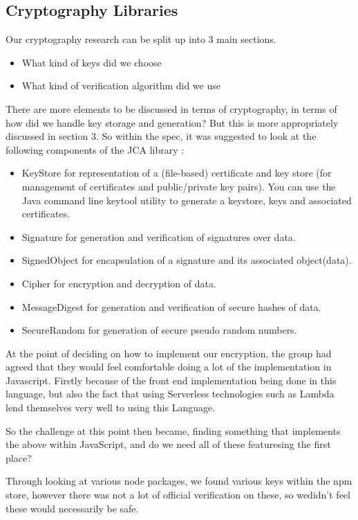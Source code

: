 \documentclass[runningheads]{llncs}
\begin{document}
\subsection{Cryptography Libraries}
Our cryptography research can be split up into 3 main sections.
\begin{itemize}
	\item What kind of keys did we choose
	\item What kind of verification algorithm did we use
\end{itemize}
There are more elements to be discussed in terms of cryptography, in terms of how did we handle key storage and generation? But this is more appropriately discussed in section 3. So within the spec, it was suggested to look at the following components of the JCA library :
\begin{itemize}
	\item KeyStore for representation of a (file-based) certificate and key store (for management of certificates and public/private key pairs). You can use the Java command line keytool utility to generate a keystore, keys and associated certificates.
	\item Signature for generation and verification of signatures over data.
	\item SignedObject for encapsulation of a signature and its associated object(data).
	\item Cipher for encryption and decryption of data.
	\item MessageDigest for generation and verification of secure hashes of data.
	\item SecureRandom for generation of secure pseudo random numbers.
\end{itemize} 
At the point of deciding on how to implement our encryption, the group had agreed that they would feel comfortable doing a lot of the implementation in Javascript. Firstly because of the front end implementation being done in this language, but also the fact that using Serverless technologies such as Lambda lend themselves very well to using this Language. 

So the challenge at this point then became, finding something that implements the above within JavaScript, and do we need all of these featuresing the first place?

Through looking at various node packages, we found various keys within the npm store, however there was not a lot of official verification on these, so wedidn't feel these would necessarily be safe.
\end{document}
